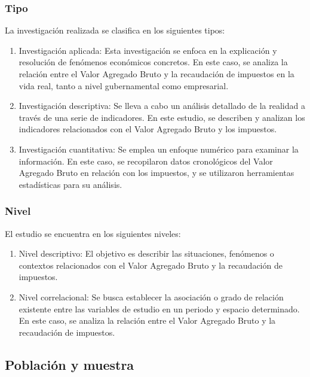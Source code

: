 \documentclass[
  letterpaper,
]{article}
\begin{document}
\hypertarget{tipo}{%
\subsubsection{Tipo}\label{tipo}}

La investigación realizada se clasifica en los siguientes tipos:

\begin{enumerate}
\def\labelenumi{\alph{enumi}.}
\item
  Investigación aplicada: Esta investigación se enfoca en la explicación
  y resolución de fenómenos económicos concretos. En este caso, se
  analiza la relación entre el Valor Agregado Bruto y la recaudación de
  impuestos en la vida real, tanto a nivel gubernamental como
  empresarial.
\item
  Investigación descriptiva: Se lleva a cabo un análisis detallado de la
  realidad a través de una serie de indicadores. En este estudio, se
  describen y analizan los indicadores relacionados con el Valor
  Agregado Bruto y los impuestos.
\item
  Investigación cuantitativa: Se emplea un enfoque numérico para
  examinar la información. En este caso, se recopilaron datos
  cronológicos del Valor Agregado Bruto en relación con los impuestos, y
  se utilizaron herramientas estadísticas para su análisis.
\end{enumerate}

\hypertarget{nivel}{%
\subsubsection{Nivel}\label{nivel}}

El estudio se encuentra en los siguientes niveles:

\begin{enumerate}
\def\labelenumi{\alph{enumi}.}
\item
  Nivel descriptivo: El objetivo es describir las situaciones, fenómenos
  o contextos relacionados con el Valor Agregado Bruto y la recaudación
  de impuestos.
\item
  Nivel correlacional: Se busca establecer la asociación o grado de
  relación existente entre las variables de estudio en un periodo y
  espacio determinado. En este caso, se analiza la relación entre el
  Valor Agregado Bruto y la recaudación de impuestos.
\end{enumerate}

\hypertarget{poblaciuxf3n-y-muestra}{%
\subsection{Población y muestra}\label{poblaciuxf3n-y-muestra}}
\end{document}
